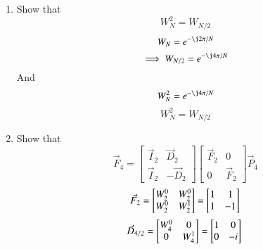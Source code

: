 \documentclass[journal,12pt,twocolumn]{IEEEtran}
\renewcommand\thesection{\arabic{section}}
\begin{document}
\begin{enumerate}[label=\thesection.\arabic*
	,ref=\thesection.\theenumi]
\begin{enumerate}[label=\arabic*.,ref=\thesection.\theenumi]
\begin{align}
\end{align}
\item Show that 
\begin{equation}
	W_{N}^{2}=W_{N/2}
\end{equation}
\solution
\begin{equation}
	W_{N} = e^{-\j2\pi/N}
\end{equation}
\begin{equation}
	\implies W_{N/2} = e^{-\j4\pi/N}
\end{equation}
And
\begin{equation}
	W_{N}^{2} = e^{-\j4\pi/N}
\end{equation}
\begin{equation}
	\boxed{W_{N}^{2} = W_{N/2}}
\end{equation}
\item Show that 
\begin{equation}
	\vec{F}_{4}=
	\begin{bmatrix}
		\vec{I}_{2} & \vec{D}_{2} \\
		\vec{I}_{2} & -\vec{D}_{2}
	\end{bmatrix}
	\begin{bmatrix}
		\vec{F}_{2} & 0 \\
		0 & \vec{F}_{2}
	\end{bmatrix}
	\vec{P}_{4}
\end{equation}
\solution
\begin{equation}
	\vec{F}_{2} = 
	\begin{bmatrix}
		W_{2}^0	&	W_{2}^0\\
		W_{2}^0	&	W_{2}^1
	\end{bmatrix}
	=		\begin{bmatrix}
		1	&	1\\
		1	&	-1
	\end{bmatrix}\\
\end{equation}
\begin{equation}
	\vec{D}_{4/2} =
	\begin{bmatrix}
		W_4^0 &	0\\
		0	&	W_4^1 
	\end{bmatrix}
	=\begin{bmatrix}
		1	&	0\\
		0	&	-i 
	\end{bmatrix}\\
\end{equation}

\end{enumerate}
\end{enumerate}
\end{document}

